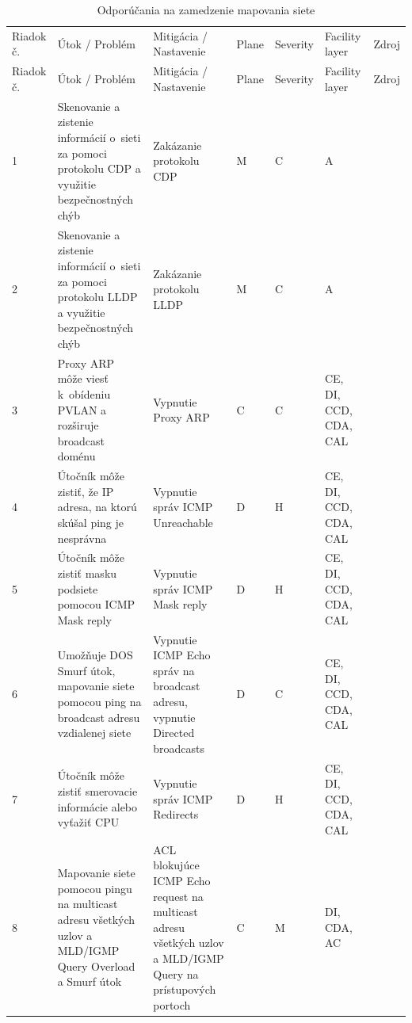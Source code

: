 \begin{longtable}[!htbp]{|C{2.5em}L{11em}L{11em}C{2.5em}C{4em}C{5em}L{2.5em}|}
	\caption{Odporúčania na zamedzenie mapovania siete}
	\label{tab:mapping}\\ \hline
	\mbox{Riadok} č.&Útok / Problém	&Mitigácia / Nastavenie	&Plane	&Severity	&Facility layer	&Zdroj\\ \hhline{=======}
	\endfirsthead 
	\hline
	\centering
	
	Riadok č.	&Útok / Problém	&Mitigácia / Nastavenie	&Plane	&Severity	&Facility layer	&Zdroj\\ \hhline{=======}
	\endhead
	
	 1	&Skenovanie a zistenie informácií o~sieti za pomoci protokolu CDP a využitie bezpečnostných chýb	&Zakázanie protokolu CDP	&M	&C	&A	& \cite{CIS_DrTLsgXv24lxeIIM}
	
	\cite{Graesser2001}\\
	2	&Skenovanie a zistenie informácií o~sieti za pomoci protokolu LLDP a využitie bezpečnostných chýb	&Zakázanie protokolu LLDP	&M	&C	&A	& \cite{McMillan2018}\\
	 3	&Proxy ARP môže viesť k~obídeniu PVLAN a rozširuje broadcast doménu	&Vypnutie Proxy ARP	&C	&C	&CE,
	DI,
	CCD,
	CDA,
	CAL	& \cite{CIS_DrTLsgXv24lxeIIM}
	
	\cite{Graesser2001}\\
	4	&Útočník môže zistiť, že IP adresa, na ktorú skúšal ping je nesprávna	&Vypnutie správ ICMP Unreachable	&D	&H	&CE,
	DI,
	CCD,
	CDA,
	CAL	& \cite{Singh2018}
	\\
	 5	&Útočník môže zistiť masku podsiete pomocou ICMP Mask reply	&Vypnutie správ ICMP Mask reply	&D	&H	&CE,
	DI,
	CCD,
	CDA,
	CAL	& \cite{Akin2002}
	\\
	6	&Umožňuje DOS Smurf útok, mapovanie siete pomocou ping na broadcast adresu vzdialenej siete	&Vypnutie ICMP Echo správ na broadcast adresu, vypnutie Directed broadcasts	&D	&C	&CE,
	DI,
	CCD,
	CDA,
	CAL	& \cite{Graesser2001}
	
	\cite{Akin2002}
	\\
	 7	&Útočník môže zistiť smerovacie informácie alebo vyťažiť CPU	&Vypnutie správ ICMP Redirects	&D	&H	&CE,
	DI,
	CCD,
	CDA,
	CAL	& \cite{Singh2018}
	\\
	8	&Mapovanie siete pomocou pingu na multicast adresu všetkých uzlov a MLD/IGMP Query Overload a Smurf útok	& ACL blokujúce ICMP Echo request na multicast adresu všetkých uzlov a MLD/IGMP Query na prístupových portoch	&C	&M	&DI,
	CDA,
	AC	&\cite{Podermanski532015}
	
	\cite{Rey2016}\\
	\hline
\end{longtable}%


